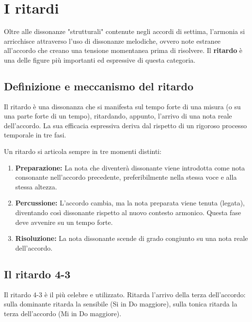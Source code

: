 \chapter{I ritardi}
\label{chap:ritardi}

Oltre alle dissonanze "strutturali" contenute negli accordi di settima, l'armonia si arricchisce attraverso l'uso di dissonanze melodiche, ovvero note estranee all'accordo che creano una tensione momentanea prima di risolvere. Il \textbf{ritardo} è una delle figure più importanti ed espressive di questa categoria.

\section{Definizione e meccanismo del ritardo}
\label{sec:definizione_ritardo}

Il ritardo è una dissonanza che si manifesta sul tempo forte di una misura (o su una parte forte di un tempo), ritardando, appunto, l'arrivo di una nota reale dell'accordo. La sua efficacia espressiva deriva dal rispetto di un rigoroso processo temporale in tre fasi.

\begin{definizione}
	\label{def:fasi_ritardo}
	Un ritardo si articola sempre in tre momenti distinti:
	\begin{enumerate}
		\item \textbf{Preparazione:} La nota che diventerà dissonante viene introdotta come nota consonante nell'accordo precedente, preferibilmente nella stessa voce e alla stessa altezza.
		\item \textbf{Percussione:} L'accordo cambia, ma la nota preparata viene tenuta (legata), diventando così dissonante rispetto al nuovo contesto armonico. Questa fase deve avvenire su un tempo forte.
		\item \textbf{Risoluzione:} La nota dissonante scende di grado congiunto su una nota reale dell'accordo.
	\end{enumerate}
\end{definizione}

\section{Il ritardo 4-3}
\label{sec:ritardo_4_3}

Il ritardo 4-3 è il più celebre e utilizzato. Ritarda l'arrivo della terza dell'accordo: sulla dominante ritarda la sensibile (Si in Do maggiore), sulla tonica ritarda la terza dell'accordo (Mi in Do maggiore).

